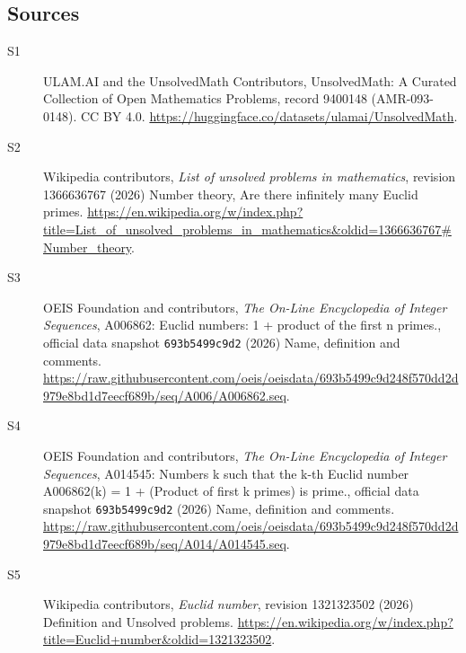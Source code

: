 \documentclass[11pt]{article}
\begin{document}
\subsection{Sources}
\begin{description}
\item[\hypertarget{source:9400148:1}{S1}] ULAM.AI and the UnsolvedMath Contributors, UnsolvedMath: A Curated Collection of Open Mathematics Problems, record 9400148 (AMR-093-0148). CC BY 4.0. \url{https://huggingface.co/datasets/ulamai/UnsolvedMath}.
\item[\hypertarget{source:9400148:2}{S2}] Wikipedia contributors, \emph{List of unsolved problems in mathematics}, revision 1366636767 (2026) Number theory, Are there infinitely many Euclid primes. \url{https://en.wikipedia.org/w/index.php?title=List_of_unsolved_problems_in_mathematics&oldid=1366636767#Number_theory}.
\item[\hypertarget{source:9400148:3}{S3}] OEIS Foundation and contributors, \emph{The On-Line Encyclopedia of Integer Sequences}, A006862: Euclid numbers: 1 + product of the first n primes., official data snapshot \texttt{693b5499c9d2} (2026) Name, definition and comments. \url{https://raw.githubusercontent.com/oeis/oeisdata/693b5499c9d248f570dd2d979e8bd1d7eecf689b/seq/A006/A006862.seq}.
\item[\hypertarget{source:9400148:4}{S4}] OEIS Foundation and contributors, \emph{The On-Line Encyclopedia of Integer Sequences}, A014545: Numbers k such that the k-th Euclid number A006862(k) = 1 + (Product of first k primes) is prime., official data snapshot \texttt{693b5499c9d2} (2026) Name, definition and comments. \url{https://raw.githubusercontent.com/oeis/oeisdata/693b5499c9d248f570dd2d979e8bd1d7eecf689b/seq/A014/A014545.seq}.
\item[\hypertarget{source:9400148:5}{S5}] Wikipedia contributors, \emph{Euclid number}, revision 1321323502 (2026) Definition and Unsolved problems. \url{https://en.wikipedia.org/w/index.php?title=Euclid+number&oldid=1321323502}.
\end{description}
\label{end:9400148}
\end{document}
